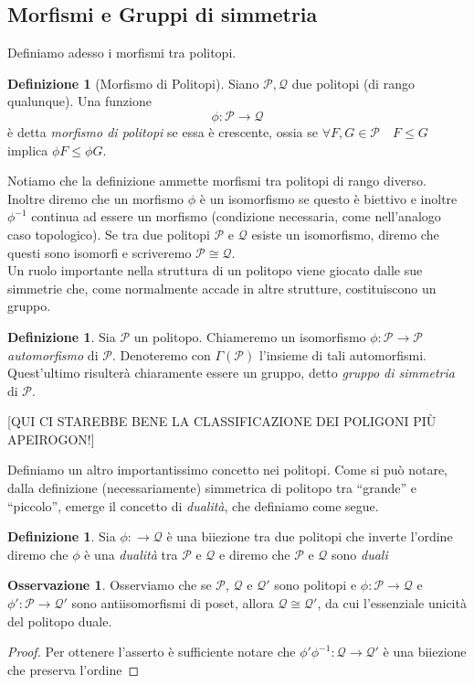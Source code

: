 \documentclass[a4paper,12pt]{report}
\newcommand{\p}{\mathcal{P}}
\theoremstyle{plain}
\theoremstyle{definition}
\newtheorem{defin}[teo]{Definizione}
\newtheorem{oss}[teo]{Osservazione}
\begin{document}
\subsection{Morfismi e Gruppi di simmetria}
Definiamo adesso i morfismi tra politopi.
\begin{defin}[Morfismo di Politopi]
Siano $\p,\mathcal{Q}$ due politopi (di rango qualunque). Una funzione
\begin{equation*}
\phi:\p\longrightarrow\mathcal{Q}
\end{equation*}
\`e detta \emph{morfismo di politopi} se essa \`e crescente, ossia se $\forall F,G\in\p\quad F\leq G$ implica $\phi F\leq\phi G$.
\end{defin}
Notiamo che la definizione ammette morfismi tra politopi di rango diverso. Inoltre diremo che un morfismo $\phi$ \`e un isomorfismo se questo \`e
biettivo e inoltre $\phi^{-1}$ continua ad essere un morfismo (condizione necessaria, come nell'analogo caso topologico).
Se tra due politopi $\p$ e $\mathcal{Q}$ esiste un isomorfismo, diremo che questi sono isomorfi e scriveremo $\p\cong\mathcal{Q}$.\\
Un ruolo importante nella struttura di un politopo viene giocato dalle sue simmetrie che, come normalmente accade in altre strutture, costituiscono un
gruppo.\\
\begin{defin}
Sia $\p$ un politopo. Chiameremo un isomorfismo $\phi:\p\longrightarrow\p$ \emph{automorfismo} di $\p$. Denoteremo con $\Gamma(\p)$ l'insieme
di tali automorfismi. Quest'ultimo risulter\`a chiaramente essere un gruppo, detto \emph{gruppo di simmetria} di $\p$.
\end{defin}
[QUI CI STAREBBE BENE LA CLASSIFICAZIONE DEI POLIGONI PI\`U APEIROGON!]

Definiamo un altro importantissimo concetto nei politopi. Come si pu\`o notare, dalla definizione (necessariamente) simmetrica di politopo
tra ``grande'' e ``piccolo'', emerge il concetto di \emph{dualit\`a}, che definiamo come segue.
\begin{defin}
Sia $\phi:\longrightarrow\mathcal{Q}$ \`e una biiezione tra due politopi che inverte l'ordine diremo che $\phi$ \`e una \emph{dualit\`a} tra
$\p$ e $\mathcal{Q}$ e diremo che $\p$ e $\mathcal{Q}$ sono \emph{duali}
\end{defin}

\begin{oss}
\label{oss:DualUnicity}
Osserviamo che se $\p$, $\mathcal{Q}$ e $\mathcal{Q}'$ sono politopi e $\phi:\p\longrightarrow\mathcal{Q}$ e $\phi':\p\longrightarrow\mathcal{Q'}$
sono antiisomorfismi di poset, allora $\mathcal{Q}\cong\mathcal{Q}'$, da cui l'essenziale unicit\`a del politopo duale.
\end{oss}
\begin{proof}
Per ottenere l'asserto \`e sufficiente notare che $\phi'\phi^{-1}:\mathcal{Q}\longrightarrow\mathcal{Q}'$ \`e una biiezione che preserva l'ordine
\end{proof}
\end{document}
